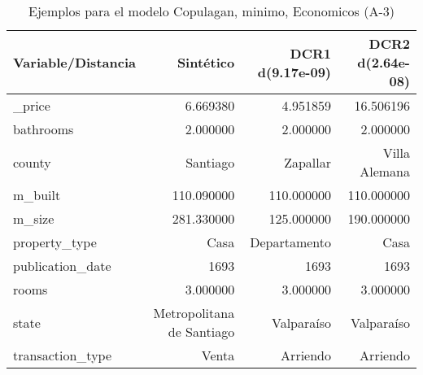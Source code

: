 \begin{table}[H]
\centering
\fontsize{10}{14}\selectfont
\caption{Ejemplos para el modelo Copulagan, minimo, Economicos (A-3)}
\label{table-example-economicos-a-3-copulagan-min}
\begin{tabular}{|l|r|r|r|}
\hline
\rowcolor[gray]{0.8}
Variable/Distancia & Sintético & DCR1 d(9.17e-09) & DCR2 d(2.64e-08) \\
\hline \_price & \cellcolor[rgb]{0.9, 0.54, 0.52} 6.669380 & 4.951859 & 16.506196 \\
\hline bathrooms & \cellcolor[rgb]{0.9, 0.54, 0.52} 2.000000 & \cellcolor[rgb]{0.9, 0.54, 0.52} 2.000000 & \cellcolor[rgb]{0.9, 0.54, 0.52} 2.000000 \\
\hline county & \cellcolor[rgb]{0.9, 0.54, 0.52} Santiago & Zapallar & Villa Alemana \\
\hline m\_built & \cellcolor[rgb]{0.9, 0.54, 0.52} 110.090000 & 110.000000 & 110.000000 \\
\hline m\_size & \cellcolor[rgb]{0.9, 0.54, 0.52} 281.330000 & 125.000000 & 190.000000 \\
\hline property\_type & \cellcolor[rgb]{0.9, 0.54, 0.52} Casa & Departamento & \cellcolor[rgb]{0.9, 0.54, 0.52} Casa \\
\hline publication\_date & \cellcolor[rgb]{0.9, 0.54, 0.52} 1693 & \cellcolor[rgb]{0.9, 0.54, 0.52} 1693 & \cellcolor[rgb]{0.9, 0.54, 0.52} 1693 \\
\hline rooms & \cellcolor[rgb]{0.9, 0.54, 0.52} 3.000000 & \cellcolor[rgb]{0.9, 0.54, 0.52} 3.000000 & \cellcolor[rgb]{0.9, 0.54, 0.52} 3.000000 \\
\hline state & \cellcolor[rgb]{0.9, 0.54, 0.52} Metropolitana de Santiago & Valparaíso & Valparaíso \\
\hline transaction\_type & \cellcolor[rgb]{0.9, 0.54, 0.52} Venta & Arriendo & Arriendo \\
\hline
\end{tabular}
\end{table}
